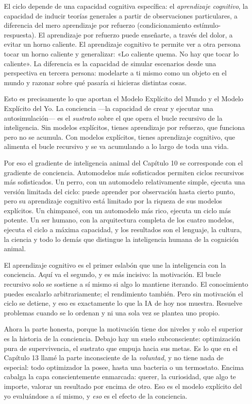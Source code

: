 \documentclass[11pt, twoside, openright]{book}
\begin{document}
El ciclo depende de una capacidad cognitiva específica: el \textit{aprendizaje cognitivo}, la capacidad de inducir teorías generales a partir de observaciones particulares, a diferencia del mero aprendizaje por refuerzo (condicionamiento estímulo-respuesta). El aprendizaje por refuerzo puede enseñarte, a través del dolor, a evitar un horno caliente. El aprendizaje cognitivo te permite ver a otra persona tocar un horno caliente y generalizar: «Lo caliente quema. No hay que tocar lo caliente». La diferencia es la capacidad de simular escenarios desde una perspectiva en tercera persona: modelarte a ti mismo como un objeto en el mundo y razonar sobre qué pasaría si hicieras distintas cosas.

Esto es precisamente lo que aportan el Modelo Explícito del Mundo y el Modelo Explícito del Yo. La conciencia ---la capacidad de crear y ejecutar una autosimulación--- es el \textit{sustrato} sobre el que opera el bucle recursivo de la inteligencia. Sin modelos explícitos, tienes aprendizaje por refuerzo, que funciona pero no se acumula. Con modelos explícitos, tienes aprendizaje cognitivo, que alimenta el bucle recursivo y se va acumulando a lo largo de toda una vida.

Por eso el gradiente de inteligencia animal del Capítulo 10 se corresponde con el gradiente de conciencia. Automodelos más sofisticados permiten ciclos recursivos más sofisticados. Un perro, con un automodelo relativamente simple, ejecuta una versión limitada del ciclo: puede aprender por observación hasta cierto punto, pero su aprendizaje cognitivo está limitado por la riqueza de sus modelos explícitos. Un chimpancé, con un automodelo más rico, ejecuta un ciclo más potente. Un ser humano, con la arquitectura completa de los cuatro modelos, ejecuta el ciclo a máxima capacidad, y los resultados son el lenguaje, la cultura, la ciencia y todo lo demás que distingue la inteligencia humana de la cognición animal.

El aprendizaje cognitivo es el primer eslabón que une la inteligencia con la conciencia. Aquí va el segundo, y es más incisivo: la motivación. El bucle recursivo solo se sostiene a sí mismo si algo lo mantiene iterando. El conocimiento puedes escalarlo arbitrariamente; el rendimiento también. Pero sin motivación el ciclo se detiene, y eso es exactamente lo que la IA de hoy nos muestra. Resuelve problemas cuando se lo ordenan y ni una sola vez se plantea uno propio.

Ahora la parte honesta, porque la motivación tiene dos niveles y solo el superior es la historia de la conciencia. Debajo hay un suelo subconsciente: optimización pura de supervivencia, el sustrato que empuja hacia sus metas. Es lo que en el Capítulo 13 llamé la parte inconsciente de la \textit{voluntad}, y no tiene nada de especial: todo optimizador la posee, hasta una bacteria o un termostato. Encima cabalga la capa conscientemente enmarcada: querer, la curiosidad, que algo te importe, valorar un resultado por encima de otro. Eso es el modelo explícito del yo evaluándose a sí mismo, y \textit{eso} es el efecto de la conciencia.
\end{document}
